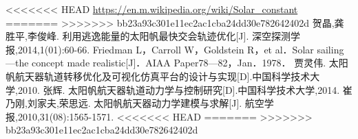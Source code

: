 \documentclass[../Paper.tex]{subfiles}
\begin{document}
\begin{thebibliography}{99}

<<<<<<< HEAD
 \url{https://en.m.wikipedia.org/wiki/Solar_constant}
=======
>>>>>>> bb23a93c301e11ec2ac1cba24dd30e782642402d
 贺晶,龚胜平,李俊峰. 利用逃逸能量的太阳帆最快交会轨迹优化[J]. 深空探测学报,2014,1(01):60-66. 
 Friedman L，Carroll W，Goldstein R，et al．Solar sailing—the concept made realistic[J]．AIAA Paper78—82，Jan．1978．
贾灵伟. 太阳帆航天器轨道转移优化及可视化仿真平台的设计与实现[D].中国科学技术大学,2010.
张辉. 太阳帆航天器轨道动力学与控制研究[D].中国科学技术大学,2014.
崔乃刚,刘家夫,荣思远. 太阳帆航天器动力学建模与求解[J]. 航空学报,2010,31(08):1565-1571. 
<<<<<<< HEAD
=======
>>>>>>> bb23a93c301e11ec2ac1cba24dd30e782642402d
	
\end{thebibliography}
\end{document}
